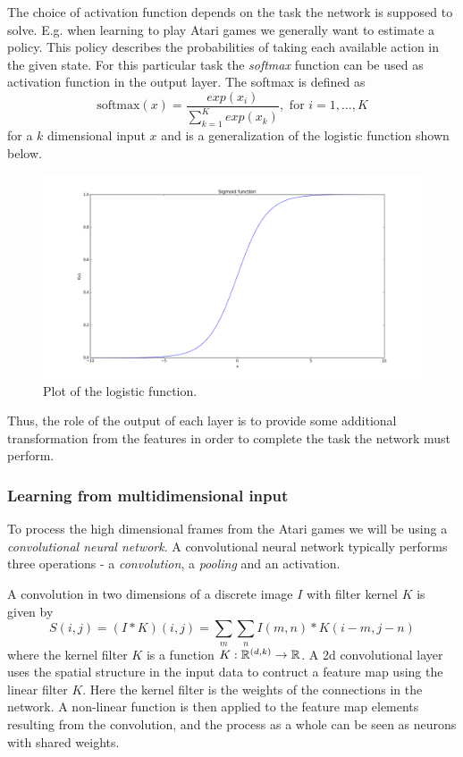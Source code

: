 \documentclass[11pt]{article}
\begin{document}
The choice of activation function depends on the task the
network is supposed to solve.
E.g. when learning to play Atari games we generally want to estimate a policy.
This policy describes the probabilities of taking each available action
in the given state.
For this particular task the \textit{softmax} function can be used as activation function
in the output layer.
The softmax is defined as
\begin{equation}
    \text{softmax}(x) = \frac{exp(x_i)}{\sum\limits_{k=1}^K exp(x_k)}, \text{ for } i = 1, \dots, K
\end{equation}
for a $k$ dimensional input $x$ and is a generalization of the logistic function shown below.

\begin{figure}[!h]
    \centering
    \includegraphics[width=15cm]{include/sigmoid.png}
    \caption{Plot of the logistic function.}
    \label{fig:softmax}
\end{figure}

Thus, the role of the output of each layer is to provide some additional
transformation from the features in order to complete the task the network
must perform\cite{DeepLearningBook}.

\subsubsection{Learning from multidimensional input}

To process the high dimensional frames from the Atari games we will be using
a \textit{convolutional neural network}.
A convolutional neural network typically performs three operations - a \textit{convolution},
a \textit{pooling} and an activation.

A convolution in two dimensions of a discrete image $I$ with filter kernel $K$
is given by 
\begin{equation}
    S(i, j) = (I \ast K)(i, j) = \sum\limits_m \sum\limits_n I(m, n) * K(i - m, j - n)
\end{equation}
where the kernel filter $K$ is a function $K : \mathbb{R}^{(d, k)} \to \mathbb{R}$.
A 2d convolutional layer uses the spatial structure in the input data to contruct a feature map
using the linear filter $K$.
Here the kernel filter is the weights of the connections in the network.
A non-linear function is then applied to the feature map elements resulting from the convolution,
and the process as a whole can be seen as neurons with shared weights\cite{IgelConv}.
\end{document}
